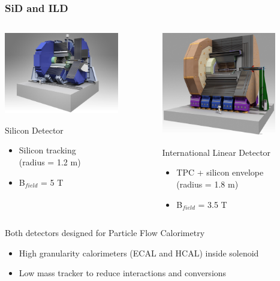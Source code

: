 \documentclass{beamer}
\begin{document}
\begin{frame}
  \frametitle{SiD and ILD}

  \begin{columns}[t]
    \begin{column}{5cm}
      \includegraphics[width = 5cm, height = 2.9 cm]{Pictures/ILC_SiD.jpg}
      \vspace{-0.25cm}
      \begin{block}{Silicon Detector}
        \footnotesize{
        \begin{itemize}
          \item Silicon tracking \\ (radius = 1.2 m)
          \item B$_{field}$ = 5 T
        \end{itemize}
        }
      \end{block}
    \end{column}

    \begin{column}{5cm}
      \includegraphics[width = 5cm, height = 2.9 cm]{Pictures/ILD_all_110826.jpg}
      \vspace{-0.25cm}
      \begin{block}{International Linear Detector}
        \footnotesize{
        \begin{itemize}
          \item TPC + silicon envelope \\ (radius = 1.8 m)
          \item B$_{field}$ = 3.5 T
        \end{itemize}
        }
      \end{block}
    \end{column}
  \end{columns}

  \begin{block}{Both detectors designed for Particle Flow Calorimetry}
    \footnotesize{
    \begin{itemize}
      \item High granularity calorimeters (ECAL and HCAL) inside solenoid
      \item Low mass tracker to reduce interactions and conversions
    \end{itemize}
    }
  \end{block}
  
\end{frame}
  
\end{document}
